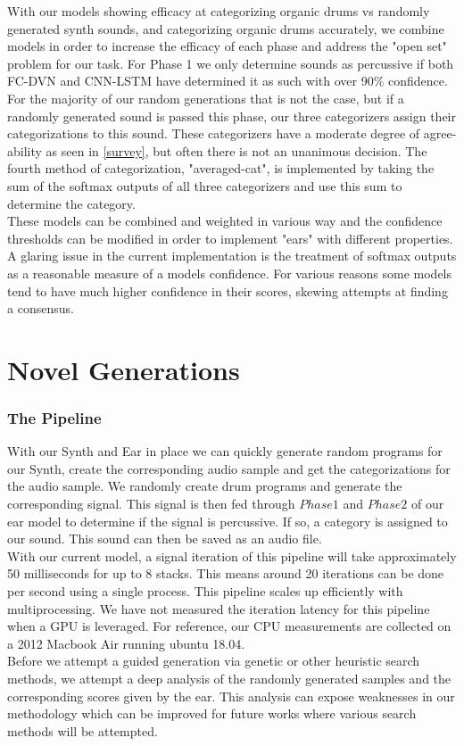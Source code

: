 \documentclass{nime-alternate} %
\begin{document}
With our models showing efficacy at categorizing organic drums vs randomly generated synth sounds, and categorizing organic drums accurately, we combine models in order to increase the efficacy of each phase and address the "open set" problem for our task. For Phase 1 we only determine sounds as percussive if both FC-DVN and CNN-LSTM have determined it as such with over 90\% confidence. For the majority of our random generations that is not the case, but if a randomly generated sound is passed this phase, our three categorizers assign their categorizations to this sound. These categorizers have a moderate degree of agree-ability as seen in \ref{survey}, but often there is not an unanimous decision. The fourth method of categorization, "averaged-cat", is implemented by taking the sum of the softmax outputs of all three categorizers and use this sum to determine the category. \\
These models can be combined and weighted in various way and the confidence thresholds can be modified in order to implement "ears" with different properties. A glaring issue in the current implementation is the treatment of softmax outputs as a reasonable measure of a models confidence. For various reasons some models tend to have much higher confidence in their scores, skewing attempts at finding a consensus. 

\section{Novel Generations}
\label{gens}
\subsubsection{The Pipeline}
 With our Synth and Ear in place we can quickly generate random programs for our Synth, create the corresponding audio sample and get the categorizations for the audio sample. We randomly create drum programs and generate the corresponding signal. This signal is then fed through $Phase 1$ and $Phase 2$ of our ear model to determine if the signal is percussive. If so, a category is assigned to our sound. This sound can then be saved as an audio file. \\
 With our current model, a signal iteration of this pipeline will take approximately 50 milliseconds for up to 8 stacks. This means around 20 iterations can be done per second using a single process. This pipeline scales up efficiently with multiprocessing. We have not measured the iteration latency for this pipeline when a GPU is leveraged. For reference, our CPU measurements are collected on a 2012 Macbook Air running ubuntu 18.04.\\
 Before we attempt a guided generation via genetic or other heuristic search methods, we attempt a deep analysis of the randomly generated samples and the corresponding scores given by the ear. This analysis can expose weaknesses in our methodology which can be improved for future works where various search methods will be attempted. 
  
\end{document}
